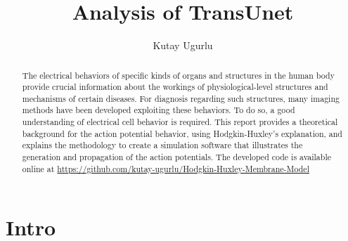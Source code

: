 \documentclass{IEEEtran}
\title{Analysis of TransUnet}
\author{Kutay Ugurlu}
\begin{document}
\maketitle
\begin{abstract}
    The electrical behaviors of specific kinds of organs and structures in the human body provide crucial information about the workings of physiological-level structures and mechanisms of certain diseases. For diagnosis regarding such structures, many imaging methods have been developed exploiting these behaviors. To do so, a good understanding of electrical cell behavior is required. This report provides a theoretical background for the action potential behavior, using Hodgkin-Huxley's explanation, and explains the methodology to create a simulation software that illustrates the generation and propagation of the action potentials. The developed code is available online at \href{https://github.com/kutay-ugurlu/Hodgkin-Huxley-Membrane-Model}{https://github.com/kutay-ugurlu/Hodgkin-Huxley-Membrane-Model}
\end{abstract}
\section{Intro}


\printbibliography{}
\end{document}
